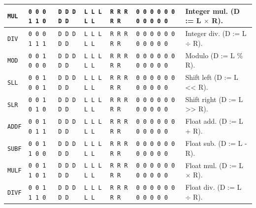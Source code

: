 \documentclass[a5paper]{report}
\begin{document}
{\begin{center}
{\begin{tabular}[ht]{
	| p{0.07 \textheight} | p{0.093 \textheight} | p{0.077 \textheight} | p{0.077 \textheight}
	| p{0.077 \textheight} | p{0.175 \textheight} | p{0.18 \textheight} |
}
	\texttt{MUL} & \texttt{0 0 0 1 1 0} & \texttt{D D D D D} & \texttt{L L L L L} & \texttt{R R R R R} &
		\texttt{0 0 0 0 0 0 0 0 0 0 0} & Integer mul. (D := L $\times$ R). \\
	\hline
	
	\texttt{DIV} & \texttt{0 0 0 1 1 1} & \texttt{D D D D D} & \texttt{L L L L L} & \texttt{R R R R R} &
		\texttt{0 0 0 0 0 0 0 0 0 0 0} & Integer div. (D := L $\div$ R). \\
	\hline
	
	\texttt{MOD} & \texttt{0 0 1 0 0 0} & \texttt{D D D D D} & \texttt{L L L L L} & \texttt{R R R R R} &
		\texttt{0 0 0 0 0 0 0 0 0 0 0} & Modulo (D := L \% R). \\
	\hline
	
	\texttt{SLL} & \texttt{0 0 1 0 0 1} & \texttt{D D D D D} & \texttt{L L L L L} & \texttt{R R R R R} &
		\texttt{0 0 0 0 0 0 0 0 0 0 0} & Shift left (D := L << R). \\
	\hline
	
	\texttt{SLR} & \texttt{0 0 1 0 1 0} & \texttt{D D D D D} & \texttt{L L L L L} & \texttt{R R R R R} &
		\texttt{0 0 0 0 0 0 0 0 0 0 0} & Shift right (D := L >> R). \\
	\hline
	
	\texttt{ADDF} & \texttt{0 0 1 0 1 1} & \texttt{D D D D D} & \texttt{L L L L L} & \texttt{R R R R R} &
		\texttt{0 0 0 0 0 0 0 0 0 0 0} & Float add. (D := L + R). \\
	\hline
	
	\texttt{SUBF} & \texttt{0 0 1 1 0 0} & \texttt{D D D D D} & \texttt{L L L L L} & \texttt{R R R R R} &
		\texttt{0 0 0 0 0 0 0 0 0 0 0} & Float sub. (D := L - R). \\
	\hline
	
	\texttt{MULF} & \texttt{0 0 1 1 0 1} & \texttt{D D D D D} & \texttt{L L L L L} & \texttt{R R R R R} &
		\texttt{0 0 0 0 0 0 0 0 0 0 0} & Float mul. (D := L $\times$ R). \\
	\hline
	
	\texttt{DIVF} & \texttt{0 0 1 1 1 0} & \texttt{D D D D D} & \texttt{L L L L L} & \texttt{R R R R R} &
		\texttt{0 0 0 0 0 0 0 0 0 0 0} & Float div. (D := L $\div$ R). \\
	\hline
\end{tabular}
}
\end{center}
}
\end{document}

